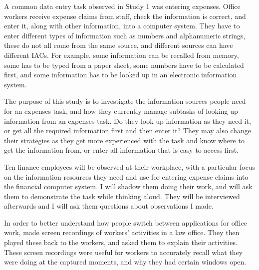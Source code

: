 A common data entry task observed in Study 1 was entering expenses. Office workers receive expense claims from staff, check the information is correct, and enter it, along with other information, into a computer system. They have to enter different types of information such as numbers and alphanumeric strings, these do not all come from the same source, and different sources can have different IACs. For example, some information can be recalled from memory, some has to be typed from a paper sheet, some numbers have to be calculated first, and some information has to be looked up in an electronic information system. 

The purpose of this study is to investigate the information sources people need for an expenses task, and how they currently manage subtasks of looking up information from an expenses task. Do they look up information as they need it, or get all the required information first and then enter it? They may also change their strategies as they get more experienced with the task and know where to get the information from, or enter all information that is easy to access first.

Ten finance employees will be observed at their workplace, with a particular focus on the information resources they need and use for entering expense claims into the financial computer system. I will shadow them doing their work, and will ask them to demonstrate the task while thinking aloud. They will be interviewed afterwards  and I will ask them questions about observations I made. 

In order to better understand how people switch between applications for office work, \citet{Cangiano2009} made screen recordings of workers' activities in a law office. They then played these back to the workers, and asked them to explain their activities. These screen recordings were useful for workers to accurately recall what they were doing at the captured moments, and why they had certain windows open. 

